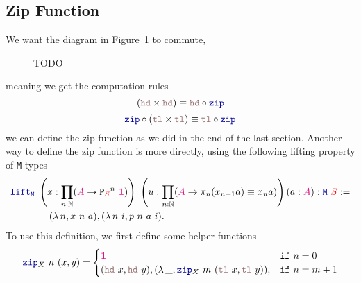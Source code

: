 \documentclass[twoside,11pt,openright]{report}
\theoremstyle{plain} %
\theoremstyle{definition}
\theoremstyle{remark}
\newcommand*{\figref}[1]{Figure~\ref{fig:#1}}
\newcommand*{\type}[1]{\textcolor{magenta!90!black}{#1}}
\newcommand*{\container}[1]{\textcolor{red}{#1}}
\newcommand*{\unit}{\type{\textbf{1}}}
\newcommand*{\function}[1]{\textcolor{blue!60!black}{\ensuremath{\mathtt{#1}}}}
\newcommand*{\destructor}[1]{\textcolor{pink!60!black}{\ensuremath{\mathtt{#1}}}}
\newcommand*{\typeformer}[1]{\ensuremath{\mathtt{#1}}}
\newcommand*{\functor}[1]{\ensuremath{\mathbf{\mathtt{#1}}}}
\begin{document}
\subsection{Zip Function}
We want the diagram in \figref{zip-computation-rules} to commute,
\begin{figure}[h]
  \centering
  \caption{TODO}
  \label{fig:zip-computation-rules}
\end{figure}
meaning we get the computation rules
\begin{equation}
  (\destructor{hd} \times \destructor{hd}) \equiv \destructor{hd} \circ \function{zip}
\end{equation}
\begin{equation}
  \function{zip} \circ (\destructor{tl} \times \destructor{tl}) \equiv \destructor{tl} \circ \function{zip}
\end{equation}
we can define the zip function as we did in the end of the last section. Another way to define the zip function is more directly, using the following lifting property of \texttt{M}-types
\begin{equation}
  \begin{aligned}
    &\function{lift_M}~\left(x : \prod_{n : \mathbb{N}} (\type{A} \rightarrow {\functor{P}_{\container{S}}}^n~\unit)\right)~\left(u : \prod_{n : \mathbb{N}} (\type{A} \rightarrow \pi_n (x_{n+1} a) \equiv x_n a)\right) (a : \type{A}) : \function{M}~\container{S} := \\
    &\qquad\qquad (\lambda\,n, x~n~a) , (\lambda\,n~i, p~n~a~i).
  \end{aligned} \label{eq:M-lift}
\end{equation}
To use this definition, we first define some helper functions
\begin{equation}
  \function{zip}_{X}~n~(x , y) = \begin{cases} \unit & \mathtt{if}~n = 0 \\ (\destructor{hd}~x , \destructor{hd}~y) , (\lambda\,\_, \function{zip}_{X}~m~(\destructor{tl}~x,\destructor{tl}~y)) , & \mathtt{if}~n = m + 1 \end{cases}
\end{equation}
\end{document}
